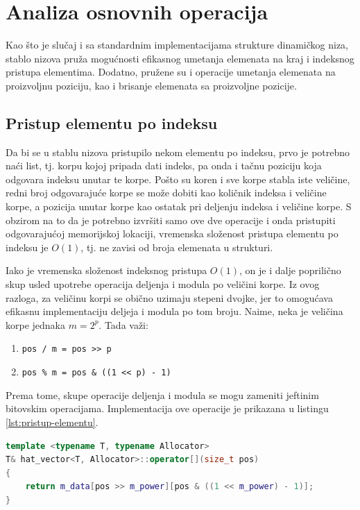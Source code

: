 \documentclass[a4paper]{article}
\begin{document}
\section{Analiza osnovnih operacija}

Kao što je slučaj i sa standardnim implementacijama strukture dinamičkog niza, stablo nizova pruža mogućnosti efikasnog umetanja elemenata na kraj i indeksnog pristupa elementima. Dodatno, pružene su i operacije umetanja elemenata na proizvoljnu poziciju, kao i brisanje elemenata sa proizvoljne pozicije.

\subsection{Pristup elementu po indeksu}

Da bi se u stablu nizova pristupilo nekom elementu po indeksu, prvo je potrebno naći list, tj. korpu kojoj pripada dati indeks, pa onda i tačnu poziciju koja odgovara indeksu unutar te korpe. Pošto su koren i sve korpe stabla iste veličine, redni broj odgovarajuće korpe se može dobiti kao količnik indeksa i veličine korpe, a pozicija unutar korpe kao ostatak pri deljenju indeksa i veličine korpe. S obzirom na to da je potrebno izvršiti samo ove dve operacije i onda pristupiti odgovarajućoj memorijskoj lokaciji, vremenska složenost pristupa elementu po indeksu je $O(1)$, tj. ne zavisi od broja elemenata u strukturi.

Iako je vremenska složenost indeksnog pristupa $O(1)$, on je i dalje poprilično skup usled upotrebe operacija deljenja i modula po veličini korpe. Iz ovog razloga, za veličinu korpi se obično uzimaju stepeni dvojke, jer to omogućava efikasnu implementaciju deljeja i modula po tom broju. Naime, neka je veličina korpe jednaka $m = 2^p$. Tada važi:
\begin{enumerate}
    \item \verb|pos / m = pos >> p|
    \item \verb|pos % m = pos & ((1 << p) - 1)|
\end{enumerate}
Prema tome, skupe operacije deljenja i modula se mogu zameniti jeftinim bitovskim operacijama. Implementacija ove operacije je prikazana u listingu \ref{lst:pristup-elementu}.

\begin{lstlisting}[language=C++, caption={Operacija pristupa elementu po indeksu \textit{pos}}, captionpos=b, label={lst:pristup-elementu}]
template <typename T, typename Allocator>
T& hat_vector<T, Allocator>::operator[](size_t pos)
{
    return m_data[pos >> m_power][pos & ((1 << m_power) - 1)];
}
\end{lstlisting}
\end{document}
